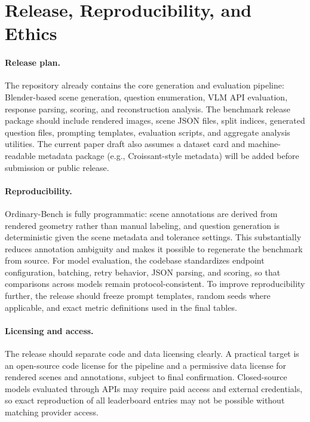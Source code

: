\section{Release, Reproducibility, and Ethics}
\label{sec:release}

\paragraph{Release plan.}
The repository already contains the core generation and evaluation pipeline: Blender-based scene generation, question enumeration, VLM API evaluation, response parsing, scoring, and reconstruction analysis. The benchmark release package should include rendered images, scene JSON files, split indices, generated question files, prompting templates, evaluation scripts, and aggregate analysis utilities. The current paper draft also assumes a dataset card and machine-readable metadata package (e.g., Croissant-style metadata) will be added before submission or public release.

\paragraph{Reproducibility.}
Ordinary-Bench is fully programmatic: scene annotations are derived from rendered geometry rather than manual labeling, and question generation is deterministic given the scene metadata and tolerance settings. This substantially reduces annotation ambiguity and makes it possible to regenerate the benchmark from source. For model evaluation, the codebase standardizes endpoint configuration, batching, retry behavior, JSON parsing, and scoring, so that comparisons across models remain protocol-consistent. To improve reproducibility further, the release should freeze prompt templates, random seeds where applicable, and exact metric definitions used in the final tables.

\paragraph{Licensing and access.}
The release should separate code and data licensing clearly. A practical target is an open-source code license for the pipeline and a permissive data license for rendered scenes and annotations, subject to final confirmation. Closed-source models evaluated through APIs may require paid access and external credentials, so exact reproduction of all leaderboard entries may not be possible without matching provider access.


